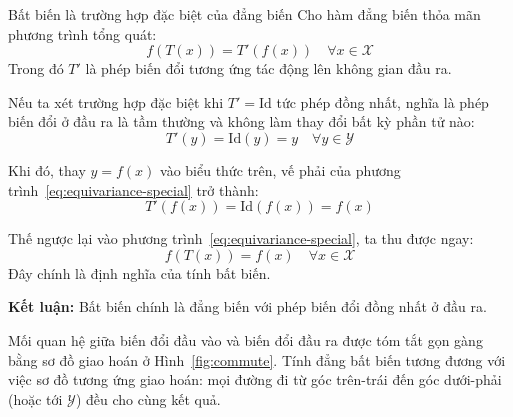 \begin{infobox}{Bất biến là trường hợp đặc biệt của đẳng biến}
Cho hàm đẳng biến thỏa mãn phương trình tổng quát:
\begin{equation}
\label{eq:equivariance-special}
f(T(x)) = T'(f(x)) \quad \forall x \in \mathcal{X}
\end{equation}
Trong đó $T'$ là phép biến đổi tương ứng tác động lên không gian đầu ra.

Nếu ta xét trường hợp đặc biệt khi $T' = \mathrm{Id}$ tức phép đồng nhất, nghĩa là phép biến đổi ở đầu ra là tầm thường và không làm thay đổi bất kỳ phần tử nào:
\begin{equation}
T'(y) = \mathrm{Id}(y) = y \quad \forall y \in \mathcal{Y}
\end{equation}

Khi đó, thay $y = f(x)$ vào biểu thức trên, vế phải của phương trình~\eqref{eq:equivariance-special} trở thành:
\begin{equation}
T'(f(x)) = \mathrm{Id}(f(x)) = f(x)
\end{equation}

Thế ngược lại vào phương trình~\eqref{eq:equivariance-special}, ta thu được ngay:
\begin{equation}
\label{eq:invariance-special}
f(T(x)) = f(x) \quad \forall x \in \mathcal{X}
\end{equation}
Đây chính là định nghĩa của tính bất biến. 


\textbf{Kết luận:} Bất biến chính là đẳng biến với phép biến đổi đồng nhất ở đầu ra.
\end{infobox}
 
Mối quan hệ giữa biến đổi đầu vào và biến đổi đầu ra được tóm tắt gọn gàng bằng
sơ đồ giao hoán ở Hình~\ref{fig:commute}. Tính
đẳng bất biến tương đương với việc sơ đồ tương ứng giao hoán: mọi đường
đi từ góc trên-trái đến góc dưới-phải (hoặc tới $\mathcal{Y}$) đều cho cùng kết
quả.
 

